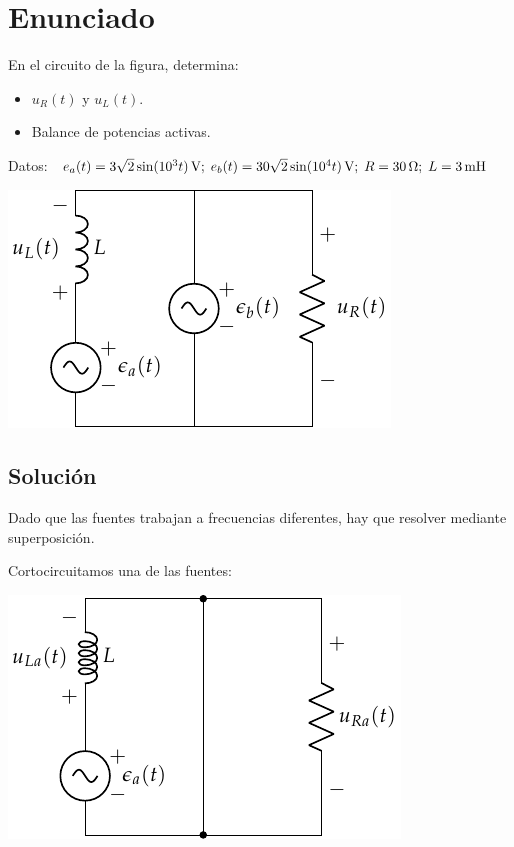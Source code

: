 
\section{Enunciado}
En el circuito de la figura, determina:
\begin{itemize}
\item $u_R(t)$ y $u_L(t)$.
\item Balance de potencias activas.
\end{itemize}
Datos: $\; e_a(t) = \qty[parse-numbers=false]{3\sqrt{2} \sin(10^3 t)}{\volt};\; e_b(t) = \qty[parse-numbers=false]{30\sqrt{2} \sin(10^4 t)}{\volt};\; R = \qty{30}{\ohm};\; L = \qty{3}{\milli\henry} $

\begin{center}
  \includegraphics{figuras/superposicion2_ej.pdf}
\end{center}

\subsection*{Solución}

Dado que las fuentes trabajan a frecuencias diferentes, hay que resolver mediante superposición.

\vspace{2mm}
Cortocircuitamos una de las fuentes:
\begin{center}
\includegraphics{figuras/superposicion2_A}
\end{center}

